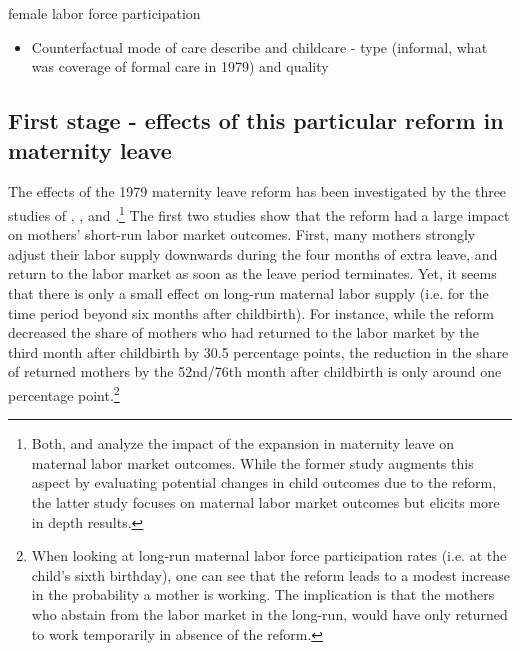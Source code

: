 \documentclass[11pt, a4paper,draft]{article} %
\begin{document}
\cite{federalstatisticaloffice1981yearbook} female labor force participation

  \begin{itemize}
    \item Counterfactual mode of care \newline describe  and childcare - type (informal, what was coverage of formal care in 1979) and quality 
  \end{itemize}
    





\bigskip
\subsection{First stage - effects of this particular reform in maternity leave}
The effects of the 1979 maternity leave reform has been investigated by the three studies of \cite{Dustmann2012}, \cite{schonberg2014expansions}, and \cite{guertzgen2018}.\footnote{Both, \cite{Dustmann2012} and \cite{schonberg2014expansions} analyze the impact of the expansion in maternity leave on maternal labor market outcomes. While the former study augments this aspect by evaluating potential changes in child outcomes due to the reform, the latter study focuses on maternal labor market outcomes but elicits more in depth results.} The first two studies show that the reform had a large impact on mothers' short-run labor market outcomes. \newline First, many mothers strongly adjust their labor supply downwards during the four months of extra leave, and return to the labor market as soon as the leave period terminates. Yet, it seems that there is only a small effect on long-run maternal labor supply (i.e. for the time period beyond six months after childbirth). For instance, while the reform decreased the share of mothers who had returned to the labor market by the third month after childbirth by 30.5 percentage points, the reduction in the share of returned mothers by the 52nd/76th month after childbirth is only around one percentage point.\footnote{When looking at long-run maternal labor force participation rates (i.e. at the child's sixth birthday), one can see that the reform leads to a modest increase in the probability a mother is working. The implication is that the mothers who abstain from the labor market in the long-run, would have only returned to work temporarily in absence of the reform.}
\end{document}

